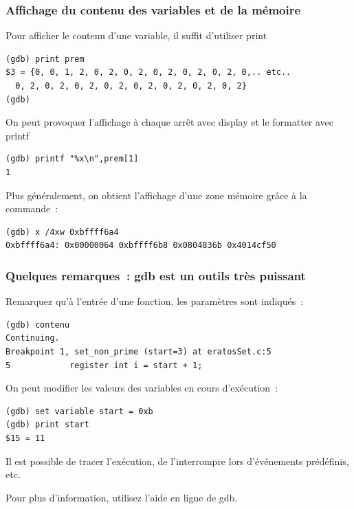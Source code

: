\begin{frame}[fragile]
  \frametitle{Affichage du contenu des variables et de la m\'emoire}
Pour  afficher  le contenu  d'une variable, il suffit d'utiliser print
\begin{verbatim}
(gdb) print prem
$3 = {0, 0, 1, 2, 0, 2, 0, 2, 0, 2, 0, 2, 0, 2, 0,.. etc..
  0, 2, 0, 2, 0, 2, 0, 2, 0, 2, 0, 2, 0, 2, 0, 2}
(gdb) 
\end{verbatim}
On peut provoquer l'affichage \`a chaque arr\^et avec display et le formatter avec printf
\begin{verbatim}
(gdb) printf "%x\n",prem[1]
1
\end{verbatim}
  Plus g\'en\'eralement, on obtient l'affichage d'une
  zone m\'emoire gr\^ace \`a la commande~:
\begin{verbatim}
(gdb) x /4xw 0xbffff6a4
0xbffff6a4: 0x00000064 0xbffff6b8 0x0804836b 0x4014cf50
\end{verbatim}
\end{frame}
\begin{frame}[fragile]
  \frametitle{Quelques remarques~: gdb est un outils tr\`es puissant}%
  Remarquez qu'\`a l'entr\'ee d'une fonction, les param\`etres sont indiqu\'es~:
\begin{verbatim}
(gdb) contenu
Continuing.
Breakpoint 1, set_non_prime (start=3) at eratosSet.c:5
5            register int i = start + 1;
\end{verbatim}
  On peut modifier les valeurs des variables en cours d'ex\'ecution~:
\begin{verbatim}
(gdb) set variable start = 0xb 
(gdb) print start
$15 = 11
\end{verbatim}
  Il est possible de tracer l'ex\'ecution, de l'interrompre lors
  d'\'ev\'enements pr\'ed\'efinis, etc.

  Pour plus d'information, utilisez l'aide en ligne de gdb. 
\end{frame}

\begin{frame}
  \section{}%
\end{frame}
